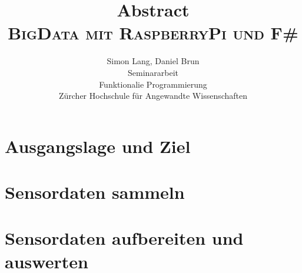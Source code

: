 \documentclass[11pt,a4paper,ngerman]{article}
\begin{document}
\rmfamily\large  
\title{\textbf{Abstract} \\ \rmfamily\huge  \textsc{BigData mit RaspberryPi und F\#}}
\author{Simon Lang, Daniel Brun\\
Seminararbeit\\
Funktionalie Programmierung\\
Zürcher Hochschule für Angewandte Wissenschaften
}
\date{} %
\maketitle\thispagestyle{empty} %

\rmfamily\normalsize
\setlength{\parindent}{0pt}
\section*{Ausgangslage und Ziel}

\section*{Sensordaten sammeln}

\section*{Sensordaten aufbereiten und auswerten}

\end{document}
